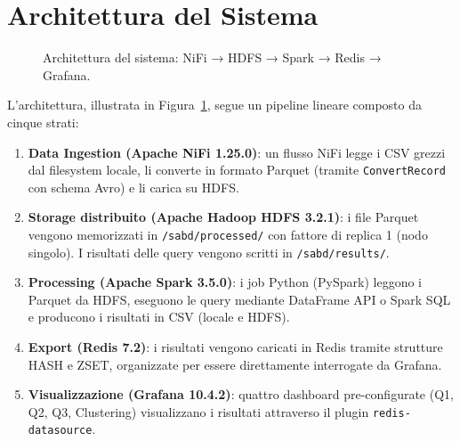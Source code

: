 \documentclass[sigconf]{acmart}
\begin{document}
\section{Architettura del Sistema}

\begin{figure}[h]
  \centering
  \caption{Architettura del sistema: NiFi → HDFS → Spark → Redis → Grafana.}
  \label{fig:arch}
\end{figure}

L'architettura, illustrata in Figura~\ref{fig:arch}, segue un pipeline
lineare composto da cinque strati:

\begin{enumerate}
  \item \textbf{Data Ingestion (Apache NiFi 1.25.0)}: un flusso NiFi legge i
        CSV grezzi dal filesystem locale, li converte in formato Parquet
        (tramite \texttt{ConvertRecord} con schema Avro) e li carica su HDFS.

  \item \textbf{Storage distribuito (Apache Hadoop HDFS 3.2.1)}: i file
        Parquet vengono memorizzati in \texttt{/sabd/processed/} con fattore
        di replica 1 (nodo singolo). I risultati delle query vengono scritti
        in \texttt{/sabd/results/}.

  \item \textbf{Processing (Apache Spark 3.5.0)}: i job Python (PySpark)
        leggono i Parquet da HDFS, eseguono le query mediante DataFrame API o
        Spark SQL e producono i risultati in CSV (locale e HDFS).

  \item \textbf{Export (Redis 7.2)}: i risultati vengono caricati in Redis
        tramite strutture HASH e ZSET, organizzate per essere direttamente
        interrogate da Grafana.

  \item \textbf{Visualizzazione (Grafana 10.4.2)}: quattro dashboard
        pre-configurate (Q1, Q2, Q3, Clustering) visualizzano i risultati
        attraverso il plugin \texttt{redis-datasource}.
\end{enumerate}
\end{document}

